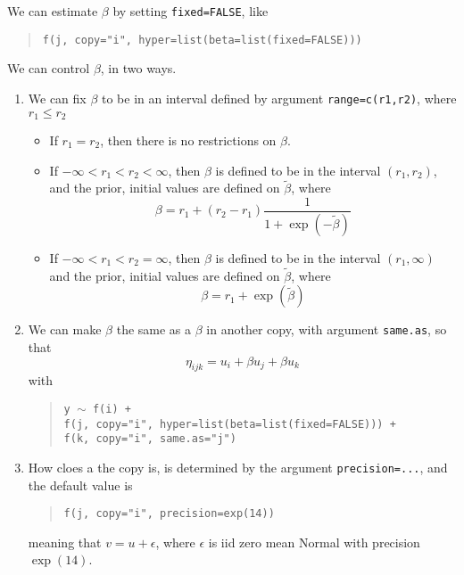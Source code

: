 \documentclass[a4paper,11pt]{article}
\begin{document}
We can estimate $\beta$ by setting \texttt{fixed=FALSE}, like
\begin{quote}
    \texttt{f(j, copy="i", hyper=list(beta=list(fixed=FALSE)))}
\end{quote}

We can control $\beta$, in two ways.
\begin{enumerate}
\item We can fix $\beta$ to be in an interval defined by argument
    \texttt{range=c(r1,r2)}, where $r_1 \leq r_2$

    \begin{itemize}
    \item If $r_1=r_2$, then there is no restrictions on $\beta$.
    \item If $-\infty < r_1 < r_2 < \infty$, then
        $\beta$ is defined to be in the interval $(r_1,
        r_2)$, and the prior, initial values are defined on
        $\tilde{\beta}$, where
        \begin{displaymath}
            \beta = r_1 + (r_2-r_1) \frac{1}{1+\exp(-\tilde{\beta})}
        \end{displaymath}
    \item If $-\infty < r_1 < r_2=\infty$, then
        $\beta$ is defined to be in the interval
        $(r_1,\infty)$ and the prior, initial values are defined on
        $\tilde{\beta}$, where
        \begin{displaymath}
            \beta = r_1 + \exp(\tilde{\beta})
        \end{displaymath}
    \end{itemize}
\item We can make $\beta$ the same as a $\beta$ in another copy, with
    argument \texttt{same.as}, so that
    \begin{displaymath}
        \eta_{ijk} = u_i + \beta u_j + \beta u_k
    \end{displaymath}
    with
    \begin{quote}
        \texttt{y $\sim$ f(i) +\\
                f(j, copy="i", hyper=list(beta=list(fixed=FALSE)))
                +\\
                f(k, copy="i", same.as="j")}
    \end{quote}
\item How cloes a the copy is, is determined by the argument
    \texttt{precision=...}, and the default value is
    \begin{quote}
        \texttt{f(j, copy="i", precision=exp(14))}
    \end{quote}
    meaning that $v = u + \epsilon$, where $\epsilon$ is iid zero mean
    Normal with precision $\exp(14)$.
\end{enumerate}
\end{document}
